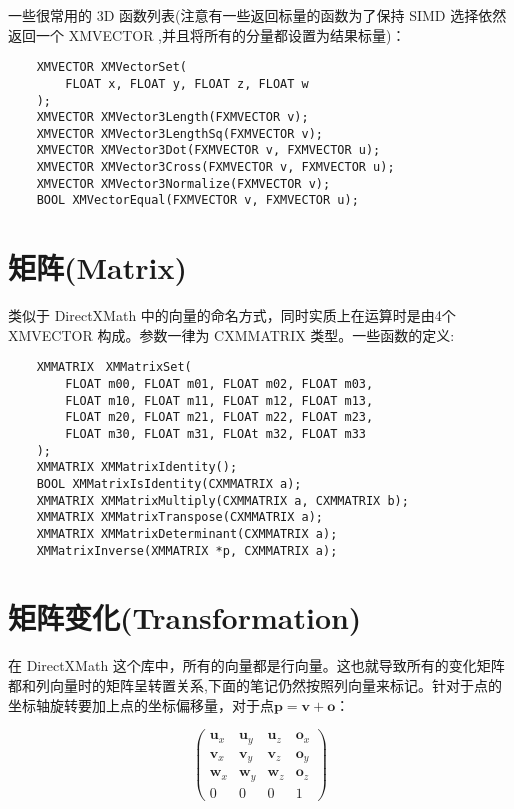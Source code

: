 \documentclass[10pt, a4paper]{article}
\begin{document}
        一些很常用的 3D 函数列表(注意有一些返回标量的函数为了保持 SIMD 选择依然返回一个 XMVECTOR ,并且将所有的分量都设置为结果标量)：

\begin{lstlisting}
    XMVECTOR XMVectorSet(
        FLOAT x, FLOAT y, FLOAT z, FLOAT w
    );
    XMVECTOR XMVector3Length(FXMVECTOR v); 
    XMVECTOR XMVector3LengthSq(FXMVECTOR v); 
    XMVECTOR XMVector3Dot(FXMVECTOR v, FXMVECTOR u); 
    XMVECTOR XMVector3Cross(FXMVECTOR v, FXMVECTOR u);
    XMVECTOR XMVector3Normalize(FXMVECTOR v);
    BOOL XMVectorEqual(FXMVECTOR v, FXMVECTOR u);
\end{lstlisting}


\section{矩阵(Matrix)}
    类似于 DirectXMath 中的向量的命名方式，同时实质上在运算时是由4个 XMVECTOR 构成。参数一律为 CXMMATRIX 类型。一些函数的定义:
\begin{lstlisting}
    XMMATRIX　XMMatrixSet(
        FLOAT m00, FLOAT m01, FLOAT m02, FLOAT m03, 
        FLOAT m10, FLOAT m11, FLOAT m12, FLOAT m13, 
        FLOAT m20, FLOAT m21, FLOAT m22, FLOAT m23, 
        FLOAT m30, FLOAT m31, FLOAt m32, FLOAT m33
    );
    XMMATRIX XMMatrixIdentity(); 
    BOOL XMMatrixIsIdentity(CXMMATRIX a);
    XMMATRIX XMMatrixMultiply(CXMMATRIX a, CXMMATRIX b); 
    XMMATRIX XMMatrixTranspose(CXMMATRIX a);
    XMMATRIX XMMatrixDeterminant(CXMMATRIX a);
    XMMatrixInverse(XMMATRIX *p, CXMMATRIX a);
\end{lstlisting}

\section{矩阵变化(Transformation)}
    在 DirectXMath 这个库中，所有的向量都是行向量。这也就导致所有的变化矩阵都和列向量时的矩阵呈转置关系,下面的笔记仍然按照列向量来标记。针对于点的坐标轴旋转要加上点的坐标偏移量，对于点$\textbf{p} = \textbf{v} + \textbf{o}$：

    \begin{equation*}
        \begin{pmatrix}
            \textbf{u}_x & \textbf{u}_y & \textbf{u}_z & \textbf{o}_x \\
            \textbf{v}_x & \textbf{v}_y & \textbf{v}_z & \textbf{o}_y \\
            \textbf{w}_x & \textbf{w}_y & \textbf{w}_z & \textbf{o}_z \\
            0 & 0 & 0 & 1  
        \end{pmatrix}
    \end{equation*}\
    
\end{document}
